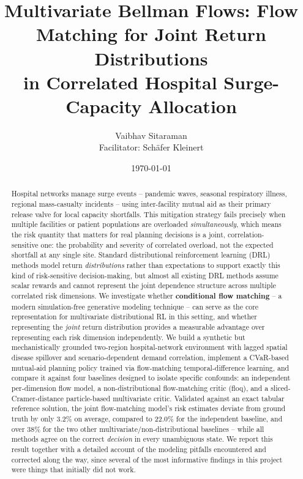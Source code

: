 \documentclass[11pt]{article}
\title{\textbf{Multivariate Bellman Flows: Flow Matching for Joint Return Distributions\\ in Correlated Hospital Surge-Capacity Allocation}}
\author{Vaibhav Sitaraman \\ \small Facilitator: Sch\"afer Kleinert}
\date{\today}
\begin{document}
\maketitle

\begin{abstract}
Hospital networks manage surge events -- pandemic waves, seasonal respiratory illness, regional mass-casualty incidents -- using inter-facility mutual aid as their primary release valve for local capacity shortfalls. This mitigation strategy fails precisely when multiple facilities or patient populations are overloaded \emph{simultaneously}, which means the risk quantity that matters for real planning decisions is a joint, correlation-sensitive one: the probability and severity of correlated overload, not the expected shortfall at any single site. Standard distributional reinforcement learning (DRL) methods model return \emph{distributions} rather than expectations to support exactly this kind of risk-sensitive decision-making, but almost all existing DRL methods assume scalar rewards and cannot represent the joint dependence structure across multiple correlated risk dimensions. We investigate whether \textbf{conditional flow matching} -- a modern simulation-free generative modeling technique -- can serve as the core representation for multivariate distributional RL in this setting, and whether representing the \emph{joint} return distribution provides a measurable advantage over representing each risk dimension independently. We build a synthetic but mechanistically grounded two-region hospital-network environment with lagged spatial disease spillover and scenario-dependent demand correlation, implement a CVaR-based mutual-aid planning policy trained via flow-matching temporal-difference learning, and compare it against four baselines designed to isolate specific confounds: an independent per-dimension flow model, a non-distributional flow-matching critic (floq), and a sliced-Cramer-distance particle-based multivariate critic. Validated against an exact tabular reference solution, the joint flow-matching model's risk estimates deviate from ground truth by only 3.2\% on average, compared to 22.0\% for the independent baseline, and over 38\% for the two other multivariate/non-distributional baselines -- while all methods agree on the correct \emph{decision} in every unambiguous state. We report this result together with a detailed account of the modeling pitfalls encountered and corrected along the way, since several of the most informative findings in this project were things that initially did not work.
\end{abstract}
\end{document}
